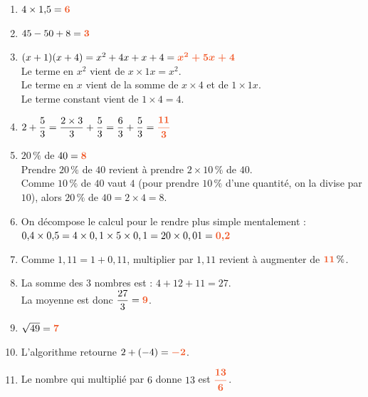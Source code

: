 \documentclass[a4paper,11pt]{article}
\newcounter{seancenum}
\newcounter{seancenumD}
\begin{document}
\setcounter{seancenumD}{23}
\newpage
\begin{seanceD}{} %

\begin{enumerate}
\item $4 \times 1{,}5={\color[HTML]{f15929}\boldsymbol{6}}$
	\item $45-50+8={\color[HTML]{f15929}\boldsymbol{3}}$
	\item $
      (x+1)(x+4)=x^2+4x+x+4
      ={\color[HTML]{f15929}\boldsymbol{x^2+5x+4}}$\\Le terme en $x^2$ vient de $x\times 1x=x^2$.\\Le terme en $x$ vient de la somme de $x \times 4$ et de $1 \times 1x$.\\Le terme constant vient de $1\times 4= 4$.
	\item $
      2+\dfrac{5}{3} = \dfrac{2 \times 3}{3} + \dfrac{5}{3} = \dfrac{6}{3} + \dfrac{5}{3}  ={\color[HTML]{f15929}\boldsymbol{\dfrac{11}{3}}}$
	\item $20\,\%$ de $40 = {\color[HTML]{f15929}\boldsymbol{8}}$\\ Prendre $20\,\%$  de $40$ revient à prendre $2\times 10\,\%$  de $40$.\\
      Comme $10\,\%$  de $40$ vaut $4$ (pour prendre $10\,\%$  d'une quantité, on la divise par $10$), alors
      $20\,\%$ de $40=2\times 4=8$.
     
	\item On décompose le calcul pour le rendre plus simple mentalement :\\  $ 0{,}4\times0{,}5 =4\times 0,1\times 5\times 0,1= 20\times 0,01
= {\color[HTML]{f15929}\boldsymbol{0{,}2}}$
	\item Comme $1{,}11=1+0{,}11$, multiplier par $1{,}11$ revient à augmenter de ${\color[HTML]{f15929}\boldsymbol{11}}\,\%$. 
	\item La somme des $3$ nombres est : $4+12+11 =27$.\\
            La moyenne est donc $\dfrac{27}{3}={\color[HTML]{f15929}\boldsymbol{9}}$.
	\item $\sqrt{49}={\color[HTML]{f15929}\boldsymbol{7}}$
	\item  L'algorithme retourne $2+(-4)={\color[HTML]{f15929}\boldsymbol{-2}}$. 
	\item Le nombre qui multiplié par $6$ donne $13$ est ${\color[HTML]{f15929}\boldsymbol{\dfrac{13}{6}}}$.
      

\end{enumerate}
\end{seanceD}
\end{document}
